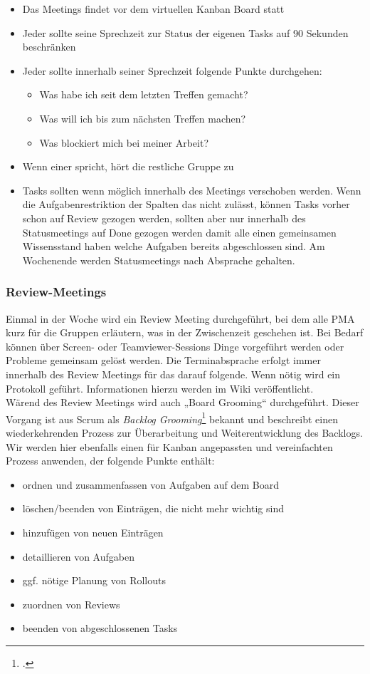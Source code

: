 \begin{itemize}
\item Das Meetings findet vor dem virtuellen Kanban Board statt
\item Jeder sollte seine Sprechzeit zur Status der eigenen Tasks auf 90 Sekunden beschränken
\item Jeder sollte innerhalb seiner Sprechzeit folgende Punkte durchgehen:
\begin{itemize}
\item Was habe ich seit dem letzten Treffen gemacht?
\item Was will ich bis zum nächsten Treffen machen?
\item Was blockiert mich bei meiner Arbeit?
\end{itemize}
\item Wenn einer spricht, hört die restliche Gruppe zu
\item Tasks sollten wenn möglich innerhalb des Meetings verschoben werden. Wenn die Aufgabenrestriktion der Spalten das nicht zulässt, können Tasks vorher schon auf Review gezogen werden, sollten aber nur innerhalb des Statusmeetings auf Done gezogen werden damit alle einen gemeinsamen Wissensstand haben welche Aufgaben bereits abgeschlossen sind. Am Wochenende werden Statusmeetings nach Absprache gehalten.
\end{itemize}

\subsubsection{Review-Meetings}
Einmal in der Woche wird ein Review Meeting durchgeführt, bei dem alle PMA kurz für die Gruppen erläutern, was in der Zwischenzeit geschehen ist. Bei Bedarf können über Screen- oder Teamviewer-Sessions Dinge vorgeführt werden oder Probleme gemeinsam gelöst werden. Die Terminabsprache erfolgt immer innerhalb des Review Meetings für das darauf folgende. Wenn nötig wird ein Protokoll geführt. Informationen hierzu werden im Wiki veröffentlicht. \\

Wärend des Review Meetings wird auch „Board Grooming“ durchgeführt. Dieser Vorgang ist aus Scrum als \textit{Backlog Grooming}\footcite{wikiScrum} bekannt und beschreibt einen wiederkehrenden Prozess zur Überarbeitung und Weiterentwicklung des Backlogs. Wir werden hier ebenfalls einen für Kanban angepassten und vereinfachten Prozess anwenden, der folgende Punkte enthält:

\begin{itemize}
\item ordnen und zusammenfassen von Aufgaben auf dem Board
\item löschen/beenden von Einträgen, die nicht mehr wichtig sind
\item hinzufügen von neuen Einträgen
\item detaillieren von Aufgaben
\item ggf. nötige Planung von Rollouts
\item zuordnen von Reviews
\item beenden von abgeschlossenen Tasks
\end{itemize}

